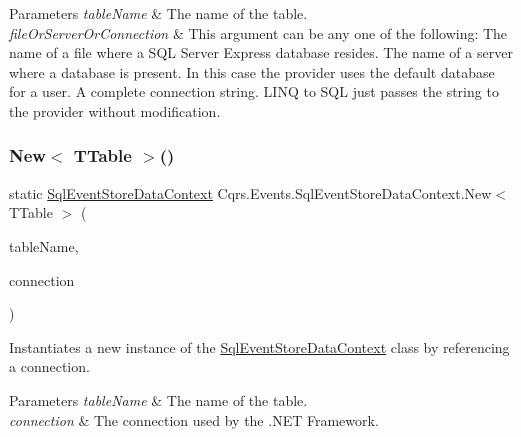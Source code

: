 \begin{DoxyParams}{Parameters}
{\em table\+Name} & The name of the table.\\
\hline
{\em file\+Or\+Server\+Or\+Connection} & This argument can be any one of the following\+: The name of a file where a S\+QL Server Express database resides. The name of a server where a database is present. In this case the provider uses the default database for a user. A complete connection string. L\+I\+NQ to S\+QL just passes the string to the provider without modification. \\
\hline
\end{DoxyParams}
\mbox{\label{classCqrs_1_1Events_1_1SqlEventStoreDataContext_a1220bc1424f6346662dc4adf1f23765f_a1220bc1424f6346662dc4adf1f23765f}} 
\subsubsection{\texorpdfstring{New$<$ T\+Table $>$()}{New< TTable >()}\hspace{0.1cm}{\footnotesize\ttfamily [2/2]}}
{\footnotesize\ttfamily static \hyperlink{classCqrs_1_1Events_1_1SqlEventStoreDataContext}{Sql\+Event\+Store\+Data\+Context} Cqrs.\+Events.\+Sql\+Event\+Store\+Data\+Context.\+New$<$ T\+Table $>$ (\begin{DoxyParamCaption}\item[{string}]{table\+Name,  }\item[{System.\+Data.\+I\+Db\+Connection}]{connection }\end{DoxyParamCaption})\hspace{0.3cm}{\ttfamily [static]}}



Instantiates a new instance of the \hyperlink{classCqrs_1_1Events_1_1SqlEventStoreDataContext}{Sql\+Event\+Store\+Data\+Context} class by referencing a connection. 


\begin{DoxyParams}{Parameters}
{\em table\+Name} & The name of the table.\\
\hline
{\em connection} & The connection used by the .N\+ET Framework.\\
\hline
\end{DoxyParams}
